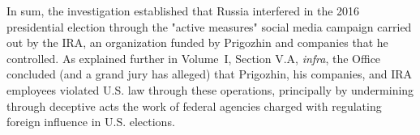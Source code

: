 \hr

In sum, the investigation established that Russia interfered in the 2016 presidential election through the "active measures" social media campaign carried out by the IRA, an organization funded by Prigozhin and companies that he controlled.
As explained further in Volume~I, Section V.A, \textit{infra}, the Office concluded (and a grand jury has alleged) that Prigozhin, his companies, and IRA employees violated U.S. law through these operations, principally by undermining through deceptive acts the work of federal agencies charged with regulating foreign influence in U.S. elections.
